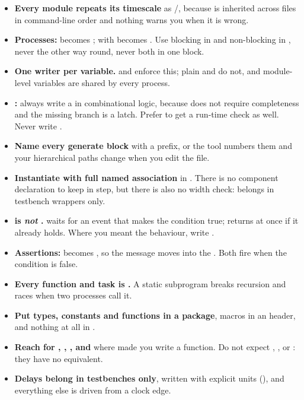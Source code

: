 \begin{itemize}
  \item \textbf{Every module repeats its timescale} as
        /, because
         is inherited across files in command-line order
        and nothing warns you when it is wrong.
  \item \textbf{Processes:}  becomes ;
         with  becomes
        . Use blocking \code{=} in
         and non-blocking \code{<=} in ,
        never the other way round, never both in one block.
  \item \textbf{One writer per variable.}  and
         enforce this; plain  and 
        do not, and module-level variables are shared by every process.
  \item \textbf{:} always write a  in combinational
        logic, because \SV{} does not require completeness and the missing
        branch is a latch. Prefer  to get a run-time check
        as well. Never write .
  \item \textbf{Name every generate block} with a  prefix, or the
        tool numbers them and your hierarchical paths change when you edit the
        file.
  \item \textbf{Instantiate with full named association} in \RTL{}. There is no
        component declaration to keep in step, but there is also no width
        check:  belongs in testbench wrappers only.
  \item \textbf{ is \emph{not} .}
        \VHDL{} waits for an event that makes the condition true; \SV{} returns
        at once if it already holds. Where you meant the \VHDL{} behaviour,
        write .
  \item \textbf{Assertions:}  becomes
        , so the message moves into the
        . Both fire when the condition is false.
  \item \textbf{Every function and task is .} A static
        subprogram breaks recursion and races when two processes call it.
  \item \textbf{Put types, constants and functions in a package}, macros in an
         header, and nothing at all in .
  \item \textbf{Reach for , , ,
         and } where \VHDL{} made you write a
        function. Do not expect , ,
         or : they have no equivalent.
  \item \textbf{Delays belong in testbenches only}, written with explicit units
        (), and everything else is driven from a clock edge.
\end{itemize}


